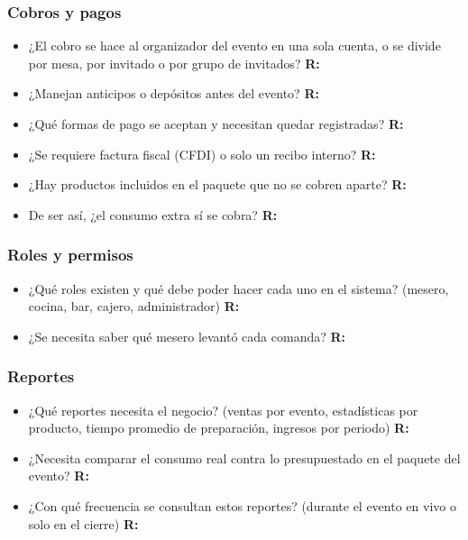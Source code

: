 \subsubsection{Cobros y pagos}

\begin{itemize}
    \item ¿El cobro se hace al organizador del evento en una sola cuenta, o se divide por mesa, por invitado o por grupo de invitados?
    \subitem \textbf{R:}

    \item ¿Manejan anticipos o depósitos antes del evento?
    \subitem \textbf{R:}

    \item ¿Qué formas de pago se aceptan y necesitan quedar registradas?
    \subitem \textbf{R:}

    \item ¿Se requiere factura fiscal (CFDI) o solo un recibo interno?
    \subitem \textbf{R:}

    \item ¿Hay productos incluidos en el paquete que no se cobren aparte?
    \subitem \textbf{R:}

    \item De ser así, ¿el consumo extra sí se cobra?
    \subitem \textbf{R:}
\end{itemize}

\subsubsection{Roles y permisos}

\begin{itemize}
    \item ¿Qué roles existen y qué debe poder hacer cada uno en el sistema? (mesero, cocina, bar, cajero, administrador)
    \subitem \textbf{R:}

    \item ¿Se necesita saber qué mesero levantó cada comanda?
    \subitem \textbf{R:}
\end{itemize}

\subsubsection{Reportes}

\begin{itemize}
    \item ¿Qué reportes necesita el negocio? (ventas por evento, estadísticas por producto, tiempo promedio de preparación, ingresos por periodo)
    \subitem \textbf{R:}

    \item ¿Necesita comparar el consumo real contra lo presupuestado en el paquete del evento?
    \subitem \textbf{R:}

    \item ¿Con qué frecuencia se consultan estos reportes? (durante el evento en vivo o solo en el cierre)
    \subitem \textbf{R:}
\end{itemize}

